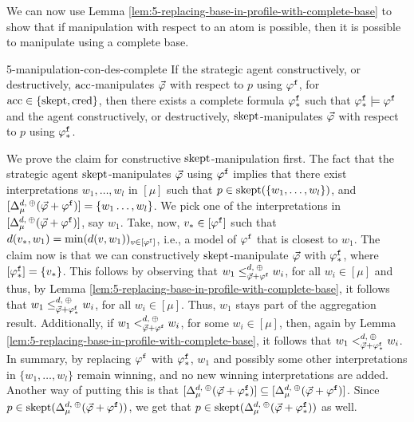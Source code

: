 We can now use Lemma \ref{lem:5-replacing-base-in-profile-with-complete-base}
to show that if manipulation with respect to an atom is possible,
then it is possible to manipulate using a complete base.

\begin{thm}{}{5-manipulation-con-des-complete}
	If the strategic agent constructively, or destructively,
	$\acc$-manipulates $\P$ with respect to $p$ using $\manip{\phi}$, 
	for $\acc\in\{\skept,\cred\}$,
	then there exists a complete formula $\manip{\phi}_\ast$ such that
	$\manip{\phi}_\ast\models\manip{\phi}$ and the agent constructively, or destructively,
	$\skept$-manipulates $\P$ with respect to $p$ using $\manip{\phi}_\ast$.
\end{thm}
\begin{prf*}{}{}%
	We prove the claim for constructive $\skept$-manipulation first. 
	The fact that the strategic agent $\skept$-manipulates $\P$ 
	using $\manip{\phi}$ implies that there 
	exist interpretations 
	$w_1,\ldots,w_l$ in $[\mu]$ such that $p\in\skept(\set{w_1, \ldots, w_l})$, and 
	$[\me^{\dd,\:\agg}_{\mu}(\P+\manip{\phi})]=\{w_1\dots,w_l\}$.
	We pick one of the interpretations in 
	$[\me^{\dd,\:\agg}_{\mu}(\P+\manip{\phi})]$, say $w_1$.
	Take, now, $v_\ast\in[\manip{\phi}]$ such that $\dd(v_\ast,w_1)=\min(\dd(v,w_1))_{v\in[\manip{\phi}]}$,
	i.e., a model of $\manip{\phi}$ that is closest to $w_1$. 
	The claim now is that we can constructively $\skept$-manipulate 
	$\P$ with $\manip{\phi}_\ast$, where $[\manip{\phi}_\ast]=\{v_\ast\}$.
	This follows by observing that $w_1\le^{\dd,\:\agg}_{\P+\manip{\phi}}w_i$, 
	for all $w_i\in[\mu]$ and thus,
	by Lemma \ref{lem:5-replacing-base-in-profile-with-complete-base}, 
	it follows that $w_1\le^{\dd,\:\agg}_{\P+\manip{\phi}_\ast}w_i$,
	for all $w_i\in[\mu]$.
	Thus, $w_1$ stays part of the aggregation result. 
	Additionally, if $w_1<^{\dd,\:\agg}_{\P+\manip{\phi}}w_i$, 
	for some $w_i\in[\mu]$, 
	then, again by Lemma \ref{lem:5-replacing-base-in-profile-with-complete-base}, 
	it follows that $w_1<^{\dd,\:\agg}_{\P+\manip{\phi}_\ast}w_i$.
	In summary, by replacing $\manip{\phi}$ with $\manip{\phi}_\ast$, 
	$w_1$ and possibly some other interpretations in 
	$\{w_1,\dots,w_l\}$ remain winning, and no new winning interpretations are added.
	Another way of putting this is that 
	$[\me^{\dd,\:\agg}_{\mu}(\P+\manip{\phi}_\ast)]\subseteq[\me^{\dd,\:\agg}_{\mu}(\P+\manip{\phi})]$.
	Since $p\in\skept(\me^{\dd,\:\agg}_{\mu}(\P+\manip{\phi}))$, 
	we get that $p\in\skept(\me^{\dd,\:\agg}_{\mu}(\P+\manip{\phi}_\ast))$ as well.
	

\end{prf*}
